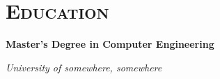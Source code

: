 \section*{\textsc{Education}}
\noindent

    \textbf{Master's Degree in Computer Engineering}
    
    \emph{University of somewhere, somewhere}
    
    \lipsumsentence[2-4]